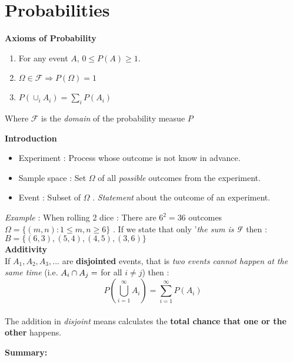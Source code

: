 \documentclass[10pt]{article}
\begin{document}
	
	\section*{Probabilities}
	
	\begin{minipage}[t]{0.4\textwidth}
		\textbf{}
		\vspace{0.3cm}
		\textbf{Axioms of Probability}
		\begin{enumerate}
			\item For any event $A$, $0 \leq P(A) \geq 1$.
			\item $\Omega \in \mathcal{F} \Rightarrow P(\Omega) = 1$
			\item $P(\cup_i A_i) = \sum_i P(A_i)$
		\end{enumerate}
		\vspace{0.3cm}
		Where $\mathcal{F}$ is the \textit{domain} of the probability measue $P$
		 
		 
	\end{minipage}
	\hfill
	\begin{minipage}[t]{0.58\textwidth}
		\textbf{Introduction}
		\vspace{0.3cm}\\
		
\begin{itemize}
	\item Experiment : Process whose outcome is not know in advance.
	\item Sample space : Set $\Omega$ of all \textit{possible} outcomes from the experiment.
	\item Event : Subset of $\Omega$ . \textit{Statement} about the outcome of an experiment. 
\end{itemize}
\vspace{0.3cm}
\textit{Example} : When rolling 2 dice :
There are  $6^2=36$ outcomes $\Omega =\{(m,n):1\leq m,n \geq 6\}$ . If we state that only '\textit{the sum is 9}' then : $B=\{(6,3),(5,4),(4,5),(3,6)\}$
\vspace{0.3cm}\\
\textbf{Additivity}
\vspace{0.3cm}\\
 If $A_1, A_2, A_3,...$ are \textbf{disjointed} events, that is \textit{two events cannot happen at the same time} (i.e. $A_i \cap A_j = \empty$ for all $i \neq j$)	then :
$$P\left( \bigcup_{i=1}^{\infty} A_i \right) = \sum_{i=1}^{\infty} P(A_i)$$\\
 The addition in \textit{disjoint} means calculates the \textbf{total chance that one or the other} happens.
 


	\end{minipage}
	
	\vspace{1cm}
	\noindent\textbf{Summary:}
\end{document}
